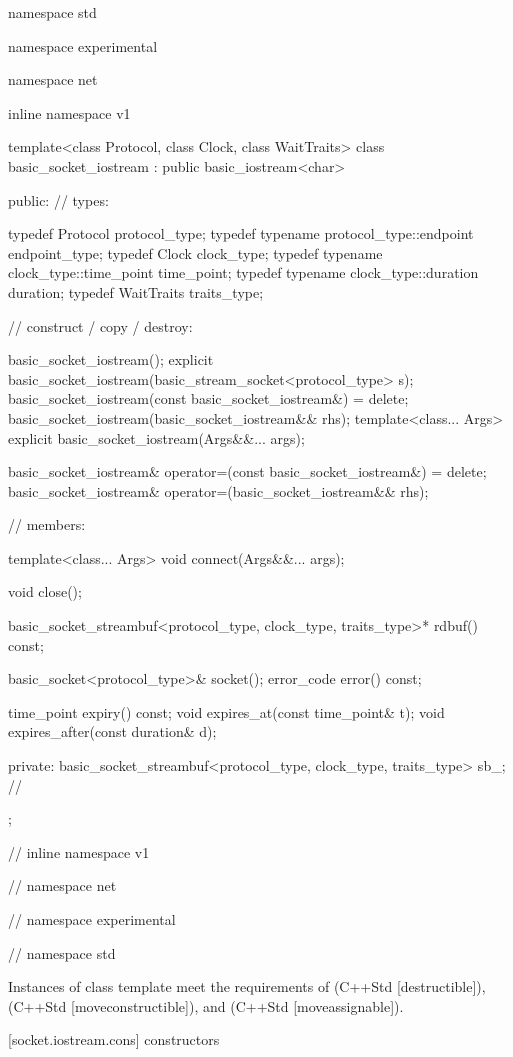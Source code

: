 \begin{codeblock}
namespace std {
namespace experimental {
namespace net {
inline namespace v1 {

  template<class Protocol, class Clock, class WaitTraits>
  class basic_socket_iostream : public basic_iostream<char>
  {
  public:
    // types:

    typedef Protocol protocol_type;
    typedef typename protocol_type::endpoint endpoint_type;
    typedef Clock clock_type;
    typedef typename clock_type::time_point time_point;
    typedef typename clock_type::duration duration;
    typedef WaitTraits traits_type;

    // construct / copy / destroy:

    basic_socket_iostream();
    explicit basic_socket_iostream(basic_stream_socket<protocol_type> s);
    basic_socket_iostream(const basic_socket_iostream&) = delete;
    basic_socket_iostream(basic_socket_iostream&& rhs);
    template<class... Args>
      explicit basic_socket_iostream(Args&&... args);

    basic_socket_iostream& operator=(const basic_socket_iostream&) = delete;
    basic_socket_iostream& operator=(basic_socket_iostream&& rhs);

    // members:

    template<class... Args> void connect(Args&&... args);

    void close();

    basic_socket_streambuf<protocol_type, clock_type, traits_type>* rdbuf() const;

    basic_socket<protocol_type>& socket();
    error_code error() const;

    time_point expiry() const;
    void expires_at(const time_point& t);
    void expires_after(const duration& d);

  private:
    basic_socket_streambuf<protocol_type, clock_type, traits_type> sb_; // \expos
  };

} // inline namespace v1
} // namespace net
} // namespace experimental
} // namespace std
\end{codeblock}

\pnum
Instances of class template  meet the requirements of  (C++Std [destructible]),  (C++Std [moveconstructible]), and  (C++Std [moveassignable]).


[socket.iostream.cons]{ constructors}

